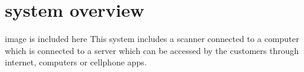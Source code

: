 \section{system overview}
image is included here
This system includes a scanner connected to a computer which is connected to a server which can be accessed by the customers through internet, computers or cellphone apps.
